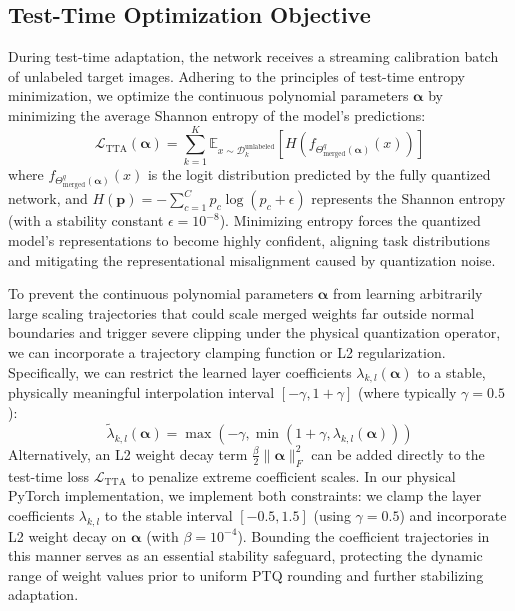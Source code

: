 \subsection{Test-Time Optimization Objective}
During test-time adaptation, the network receives a streaming calibration batch of unlabeled target images. Adhering to the principles of test-time entropy minimization, we optimize the continuous polynomial parameters $\boldsymbol{\alpha}$ by minimizing the average Shannon entropy of the model's predictions:
\begin{equation}
\mathcal{L}_{\text{TTA}}(\boldsymbol{\alpha}) = \sum_{k=1}^K \mathbb{E}_{x \sim \mathcal{D}_k^{\text{unlabeled}}} \left[ H\left( f_{\Theta^q_{\text{merged}}(\boldsymbol{\alpha})}(x) \right) \right]
\end{equation}
where $f_{\Theta^q_{\text{merged}}(\boldsymbol{\alpha})}(x)$ is the logit distribution predicted by the fully quantized network, and $H(\mathbf{p}) = -\sum_{c=1}^C p_c \log (p_c + \epsilon)$ represents the Shannon entropy (with a stability constant $\epsilon = 10^{-8}$). Minimizing entropy forces the quantized model's representations to become highly confident, aligning task distributions and mitigating the representational misalignment caused by quantization noise.

To prevent the continuous polynomial parameters $\boldsymbol{\alpha}$ from learning arbitrarily large scaling trajectories that could scale merged weights far outside normal boundaries and trigger severe clipping under the physical quantization operator, we can incorporate a trajectory clamping function or L2 regularization. Specifically, we can restrict the learned layer coefficients $\lambda_{k, l}(\boldsymbol{\alpha})$ to a stable, physically meaningful interpolation interval $[-\gamma, 1+\gamma]$ (where typically $\gamma = 0.5$):
\begin{equation}
\tilde{\lambda}_{k, l}(\boldsymbol{\alpha}) = \max\left(-\gamma, \min\left(1+\gamma, \lambda_{k, l}(\boldsymbol{\alpha})\right)\right)
\end{equation}
Alternatively, an L2 weight decay term $\frac{\beta}{2} \|\boldsymbol{\alpha}\|_F^2$ can be added directly to the test-time loss $\mathcal{L}_{\text{TTA}}$ to penalize extreme coefficient scales. In our physical PyTorch implementation, we implement both constraints: we clamp the layer coefficients $\lambda_{k, l}$ to the stable interval $[-0.5, 1.5]$ (using $\gamma = 0.5$) and incorporate L2 weight decay on $\boldsymbol{\alpha}$ (with $\beta = 10^{-4}$). Bounding the coefficient trajectories in this manner serves as an essential stability safeguard, protecting the dynamic range of weight values prior to uniform PTQ rounding and further stabilizing adaptation.

